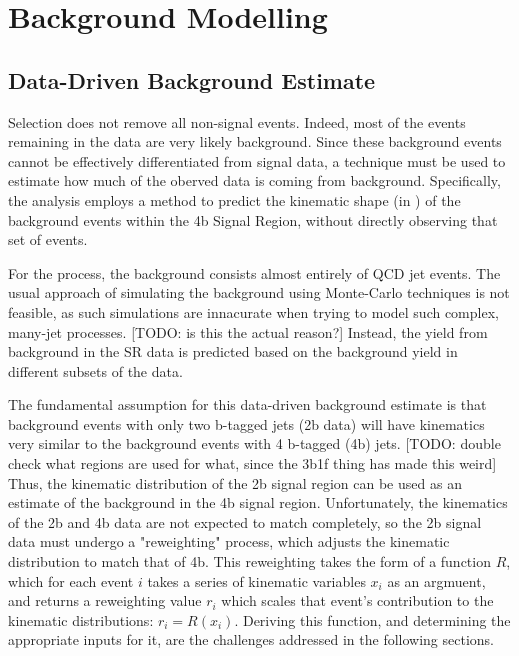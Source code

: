 \chapter{Background Modelling} \label{chapter:background}

\section{Data-Driven Background Estimate}

    Selection does not remove all non-signal events.
    Indeed, most of the events remaining in the data are very likely background.
    Since these background events cannot be effectively differentiated from signal data,
        a technique must be used to estimate how much of the oberved data is coming from background.
    Specifically, the analysis employs a method to predict the kinematic shape (in \mhh)
        of the background events within the 4b Signal Region,
        without directly observing that set of events.

    For the \vbfproc process, the background consists almost entirely of QCD jet events.
    The usual approach of simulating the background using Monte-Carlo techniques is not feasible,
        as such simulations are innacurate when trying to model such complex, many-jet processes. [TODO: is this the actual reason?]
    Instead, the yield from background in the SR data is predicted based on the background yield in different subsets of the data.
        
    The fundamental assumption for this data-driven background estimate
        is that background events with only two b-tagged jets (2b data)
        will have kinematics very similar to the background events with 4 b-tagged (4b) jets.
    [TODO: double check what regions are used for what, since the 3b1f thing has made this weird]
    Thus, the kinematic distribution of the 2b signal region can be used as an estimate of the background in the 4b signal region.
    Unfortunately, the kinematics of the 2b and 4b data are not expected to match completely,
        so the 2b signal data must undergo a "reweighting" process,
        which adjusts the kinematic distribution to match that of 4b.
    This reweighting takes the form of a function $R$,
        which for each event $i$ takes a series of kinematic variables $x_i$ as an argmuent,
        and returns a reweighting value $r_i$ which scales that event's contribution to the kinematic distributions:
        $r_i = R(x_i)$.
    Deriving this function, and determining the appropriate inputs for it,
        are the challenges addressed in the following sections.

